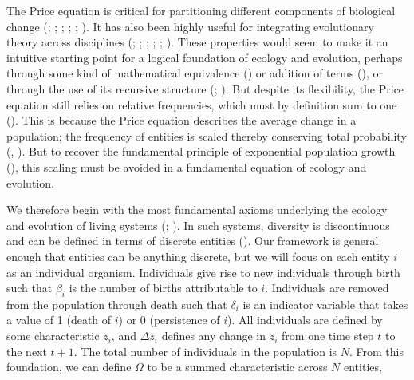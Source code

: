 \documentclass[
]{article}
\begin{document}
The Price equation is critical for partitioning different components of
biological change (;
; ; ;
;
). It has also been highly
useful for integrating evolutionary theory across disciplines
(;
;
;
; ; ). These
properties would seem to make it an intuitive starting point for a
logical foundation of ecology and evolution, perhaps through some kind
of mathematical equivalence () or addition of terms (), or through the use of its recursive structure
(;
). But despite its flexibility, the
Price equation still relies on relative frequencies, which must by
definition sum to one (). This is
because the Price equation describes the average change in a population;
the frequency of entities is scaled thereby conserving total probability
(, ).
But to recover the fundamental principle of exponential population
growth (), this scaling must be
avoided in a fundamental equation of ecology and evolution.

We therefore begin with the most fundamental axioms underlying the
ecology and evolution of living systems (; ). In such
systems, diversity is discontinuous and can be defined in terms of
discrete entities (). Our
framework is general enough that entities can be anything discrete, but
we will focus on each entity \(i\) as an individual organism.
Individuals give rise to new individuals through birth such that
\(\beta_{i}\) is the number of births attributable to \(i\). Individuals
are removed from the population through death such that \(\delta_{i}\)
is an indicator variable that takes a value of 1 (death of \(i\)) or 0
(persistence of \(i\)). All individuals are defined by some
characteristic \(z_{i}\), and \(\Delta z_{i}\) defines any change in
\(z_{i}\) from one time step \(t\) to the next \(t + 1\). The total
number of individuals in the population is \(N\). From this foundation,
we can define \(\Omega\) to be a summed characteristic across \(N\)
entities,
\end{document}

